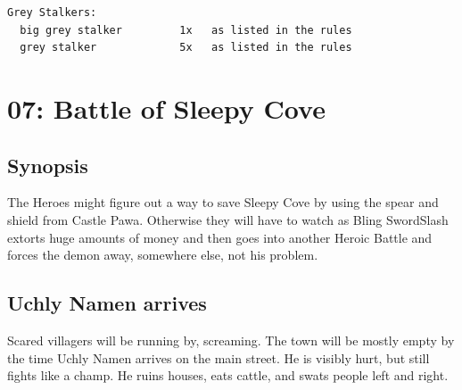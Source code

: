 \begin{samepage} \vsmall \begin{verbatim}
Grey Stalkers:
  big grey stalker         1x   as listed in the rules
  grey stalker             5x   as listed in the rules
\end{verbatim} \normalsize \end{samepage}


%


















\clearpage
{}
\section*{07: Battle of Sleepy Cove}


\subsection*{Synopsis}
The Heroes might figure out a way to save Sleepy Cove by using the spear and shield from Castle Pawa. Otherwise they will have to watch as Bling SwordSlash extorts huge amounts of money and then goes into another Heroic Battle and forces the demon away, somewhere else, not his problem.


\subsection*{Uchly Namen arrives}
Scared villagers will be running by, screaming. The town will be mostly empty by the time Uchly Namen arrives on the main street. He is visibly hurt, but still fights like a champ. He ruins houses, eats cattle, and swats people left and right.

